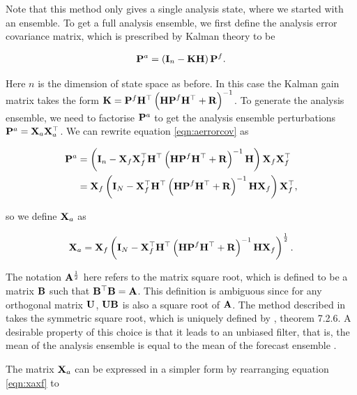 Note that this method only gives a single analysis state, where we started with an ensemble. To get a full analysis ensemble, we first define the analysis error covariance matrix, which is prescribed by Kalman theory \citep[section 3.4.3]{Asch2016} to be 

\begin{equation}
\mathbf{P}^a = \left( \mathbf{I}_n - \mathbf{KH} \right) \mathbf{P}^f .
\label{eqn:aerrorcov}
\end{equation}

Here $n$ is the dimension of state space as before. In this case the Kalman gain matrix takes the form $\mathbf{K} = \mathbf{P}^f\mathbf{H}^\top \left(\mathbf{HP}^f\mathbf{H}^\top + \mathbf{R} \right)^{-1}$. To generate the analysis ensemble, we need to factorise $\mathbf{P}^a$ to get the analysis ensemble perturbations $\mathbf{P}^a = \mathbf{X}_a\mathbf{X}_a^\top$. We can rewrite equation \ref{eqn:aerrorcov} as

\begin{align*}
\mathbf{P}^a &= \left( \mathbf{I}_n - \mathbf{X}_f \mathbf{X}_f^\top \mathbf{H}^\top \left(\mathbf{HP}^f\mathbf{H}^\top + \mathbf{R} \right)^{-1} \mathbf{H} \right) \mathbf{X}_f \mathbf{X}_f^\top \\
&= \mathbf{X}_f \left( \mathbf{I}_N - \mathbf{X}_f^\top \mathbf{H}^\top \left(\mathbf{HP}^f\mathbf{H}^\top + \mathbf{R} \right)^{-1} \mathbf{H} \mathbf{X}_f \right) \mathbf{X}_f^\top,
\end{align*}

so we define $\mathbf{X}_a$ as

\begin{equation}
\mathbf{X}_a = \mathbf{X}_f \left( \mathbf{I}_N - \mathbf{X}_f^\top \mathbf{H}^\top \left(\mathbf{HP}^f\mathbf{H}^\top + \mathbf{R} \right)^{-1} \mathbf{H} \mathbf{X}_f \right) ^{\frac 1 2}.
\label{eqn:xaxf}
\end{equation}

The notation $\mathbf{A}^{\frac 1 2}$ here refers to the matrix square root, which is defined to be a matrix $\mathbf{B}$ such that $\mathbf{B}^\top\mathbf{B} = \mathbf{A}$. This definition is ambiguous since for any orthogonal matrix $\mathbf{U}$, $\mathbf{UB}$ is also a square root of $\mathbf{A}$. The method described in \citet{Hunt2007} takes the symmetric square root, which is uniquely defined by \citet{Horn2013}, theorem 7.2.6. A desirable property of this choice is that it leads to an unbiased filter, that is, the mean of the analysis ensemble is equal to the mean of the forecast ensemble \citep{Livings2008}.

The matrix $\mathbf{X}_a$ can be expressed in a simpler form by rearranging equation \ref{eqn:xaxf} to

